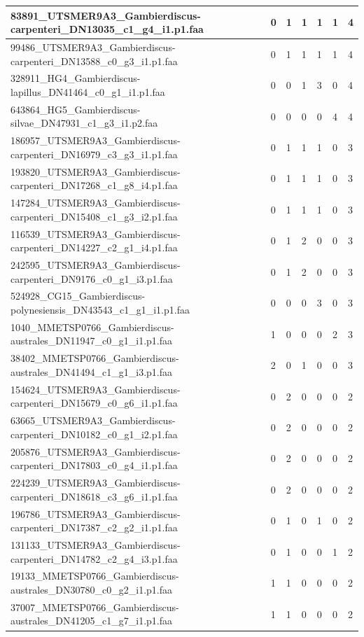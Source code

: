 \documentclass[12pt]{article}
\begin{document}
\begin{longtable}{ | p{2cm} | p{2cm} |p{2.5cm} | p{2cm} | p{2.5cm} |  p{2cm} | p{2cm} |}
 \hline 
83891\_UTSMER9A3\_Gambierdiscus-carpenteri\_DN13035\_c1\_g4\_i1.p1.faa&0&1&1&1&1&4\\ 
 \hline 
99486\_UTSMER9A3\_Gambierdiscus-carpenteri\_DN13588\_c0\_g3\_i1.p1.faa&0&1&1&1&1&4\\ 
 \hline 
328911\_HG4\_Gambierdiscus-lapillus\_DN41464\_c0\_g1\_i1.p1.faa&0&0&1&3&0&4\\ 
 \hline 
643864\_HG5\_Gambierdiscus-silvae\_DN47931\_c1\_g3\_i1.p2.faa&0&0&0&0&4&4\\ 
 \hline 
186957\_UTSMER9A3\_Gambierdiscus-carpenteri\_DN16979\_c3\_g3\_i1.p1.faa&0&1&1&1&0&3\\ 
 \hline 
193820\_UTSMER9A3\_Gambierdiscus-carpenteri\_DN17268\_c1\_g8\_i4.p1.faa&0&1&1&1&0&3\\ 
 \hline 
147284\_UTSMER9A3\_Gambierdiscus-carpenteri\_DN15408\_c1\_g3\_i2.p1.faa&0&1&1&1&0&3\\ 
 \hline 
116539\_UTSMER9A3\_Gambierdiscus-carpenteri\_DN14227\_c2\_g1\_i4.p1.faa&0&1&2&0&0&3\\ 
 \hline 
242595\_UTSMER9A3\_Gambierdiscus-carpenteri\_DN9176\_c0\_g1\_i3.p1.faa&0&1&2&0&0&3\\ 
 \hline 
524928\_CG15\_Gambierdiscus-polynesiensis\_DN43543\_c1\_g1\_i1.p1.faa&0&0&0&3&0&3\\ 
 \hline 
1040\_MMETSP0766\_Gambierdiscus-australes\_DN11947\_c0\_g1\_i1.p1.faa&1&0&0&0&2&3\\ 
 \hline 
38402\_MMETSP0766\_Gambierdiscus-australes\_DN41494\_c1\_g1\_i3.p1.faa&2&0&1&0&0&3\\ 
 \hline 
154624\_UTSMER9A3\_Gambierdiscus-carpenteri\_DN15679\_c0\_g6\_i1.p1.faa&0&2&0&0&0&2\\ 
 \hline 
63665\_UTSMER9A3\_Gambierdiscus-carpenteri\_DN10182\_c0\_g1\_i2.p1.faa&0&2&0&0&0&2\\ 
 \hline 
205876\_UTSMER9A3\_Gambierdiscus-carpenteri\_DN17803\_c0\_g4\_i1.p1.faa&0&2&0&0&0&2\\ 
 \hline 
224239\_UTSMER9A3\_Gambierdiscus-carpenteri\_DN18618\_c3\_g6\_i1.p1.faa&0&2&0&0&0&2\\ 
 \hline 
196786\_UTSMER9A3\_Gambierdiscus-carpenteri\_DN17387\_c2\_g2\_i1.p1.faa&0&1&0&1&0&2\\ 
 \hline 
131133\_UTSMER9A3\_Gambierdiscus-carpenteri\_DN14782\_c2\_g4\_i3.p1.faa&0&1&0&0&1&2\\ 
 \hline 
19133\_MMETSP0766\_Gambierdiscus-australes\_DN30780\_c0\_g2\_i1.p1.faa&1&1&0&0&0&2\\ 
 \hline 
37007\_MMETSP0766\_Gambierdiscus-australes\_DN41205\_c1\_g7\_i1.p1.faa&1&1&0&0&0&2\\ 

\end{longtable}
\end{document}
